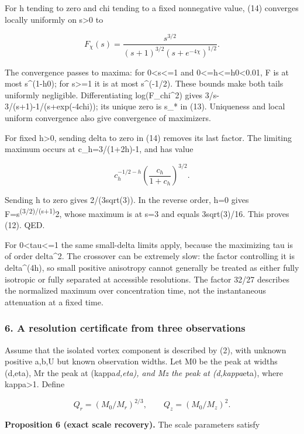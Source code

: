 \documentclass[
]{article}
\begin{document}
For h tending to zero and chi tending to a fixed nonnegative value, (14)
converges locally uniformly on s\textgreater0 to

\[
F_\chi(s)=\frac{s^{3/2}}{(s+1)^{3/2}(s+e^{-4\chi})^{1/2}}. \tag{15}
\]

The convergence passes to maxima: for 0\textless s\textless=1 and
0\textless=h\textless=h0\textless0.01, F is at most s\^{}(1-h0); for
s\textgreater=1 it is at most s\^{}(-1/2). These bounds make both tails
uniformly negligible. Differentiating log(F\_chi\^{}2) gives
3/s-3/(s+1)-1/(s+exp(-4chi)); its unique zero is s\_* in (13).
Uniqueness and local uniform convergence also give convergence of
maximizers.

For fixed h\textgreater0, sending delta to zero in (14) removes its last
factor. The limiting maximum occurs at c\_h=3/(1+2h)-1, and has value

\[
c_h^{-1/2-h}\left(\frac{c_h}{1+c_h}\right)^{3/2}. \tag{16}
\]

Sending h to zero gives 2/(3sqrt(3)). In the reverse order, h=0 gives
F=s\textsuperscript{(3/2)/(s+1)}2, whose maximum is at s=3 and equals
3sqrt(3)/16. This proves (12). QED.

For 0\textless tau\textless=1 the same small-delta limits apply, because
the maximizing tau is of order delta\^{}2. The crossover can be
extremely slow: the factor controlling it is delta\^{}(4h), so small
positive anisotropy cannot generally be treated as either fully
isotropic or fully separated at accessible resolutions. The factor 32/27
describes the normalized maximum over concentration time, not the
instantaneous attenuation at a fixed time.

\hypertarget{a-resolution-certificate-from-three-observations}{%
\subsubsection{6. A resolution certificate from three
observations}\label{a-resolution-certificate-from-three-observations}}

Assume that the isolated vortex component is described by (2), with
unknown positive a,b,U but known observation widths. Let M0 be the peak
at widths (d,eta), Mr the peak at (kappa\emph{d,eta), and Mz the peak at
(d,kappa}eta), where kappa\textgreater1. Define

\[
Q_r=(M_0/M_r)^{2/3},\qquad Q_z=(M_0/M_z)^2.
\tag{17}
\]

\textbf{Proposition 6 (exact scale recovery).} The scale parameters
satisfy
\end{document}
